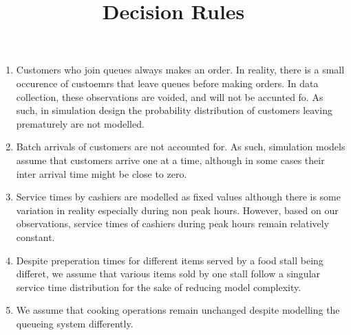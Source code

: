 \documentclass{article}
\begin{document}
\pagecolor{ultramarine}
\title{Decision Rules}
\author{}
\date{}
\maketitle
\begin{enumerate}
    \item Customers who join queues always makes an order. In reality, there is a small occurence of custoemrs that leave queues before making orders. In data collection, these observations are voided, and will not be accunted fo. As such, in simulation design the probability distribution of customers leaving prematurely are not modelled.
    \item Batch arrivals of customers are not accounted for. As such, simulation models assume that customers arrive one at a time, although in some cases their inter arrival time might be close to zero.
    \item Service times by cashiers are modelled as fixed values although there is some variation in reality especially during non peak hours. However, based on our observations, service times of cashiers during peak hours remain relatively constant.
    \item Despite preperation times for different items served by a food stall being differet, we assume that various items sold by one stall follow a singular service time distribution for the sake of reducing model complexity.
    \item We assume that cooking operations remain unchanged despite modelling the queueing system differently.
\end{enumerate}
\end{document}
